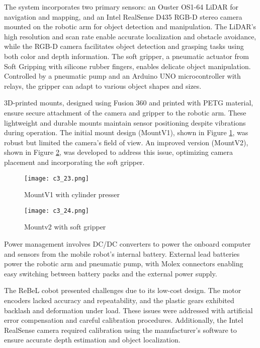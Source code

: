 The system incorporates two primary sensors: an Ouster OS1-64 LiDAR for navigation and mapping, and an Intel 
RealSense D435 RGB-D stereo camera mounted on the robotic arm for object detection and manipulation. 
The LiDAR's high resolution and scan rate enable accurate localization and obstacle avoidance, while the RGB-D 
camera facilitates object detection and grasping tasks using both color and depth information.
The soft gripper, a pneumatic actuator from Soft Gripping with silicone rubber fingers, enables delicate object
manipulation. Controlled by a pneumatic pump and an Arduino UNO microcontroller with relays, the gripper can 
adapt to various object shapes and sizes.

3D-printed mounts, designed using Fusion 360 and printed with PETG material, ensure secure attachment of the 
camera and gripper to the robotic arm. These lightweight and durable mounts maintain sensor positioning despite
vibrations during operation.
The initial mount design (MountV1), shown in Figure \ref{fig:mountv1}, was robust but limited the camera's field of view. 
An improved version (MountV2), shown in Figure \ref{fig:mountv2},
was developed to address this issue, optimizing camera placement and incorporating the soft gripper.

\begin{figure}[t]
    \centering
    \texttt{[image: c3\_23.png]}
    \caption{MountV1 with cylinder presser}
    \label{fig:mountv1}
\end{figure}

\begin{figure}[t]
    \centering
    \texttt{[image: c3\_24.png]}
    \caption{Mountv2 with soft gripper}
    \label{fig:mountv2}
\end{figure}

Power management involves DC/DC converters to power the onboard computer and sensors from the mobile robot's 
internal battery. External lead batteries power the robotic arm and pneumatic pump, with Molex connectors enabling
easy switching between battery packs and the external power supply.

The ReBeL cobot presented challenges due to its low-cost design. The motor encoders lacked accuracy and repeatability,
and the plastic gears exhibited backlash and deformation under load. These issues were addressed with artificial 
error compensation and careful calibration procedures.
Additionally, the Intel RealSense camera required calibration using the manufacturer's software to ensure accurate
depth estimation and object localization.

